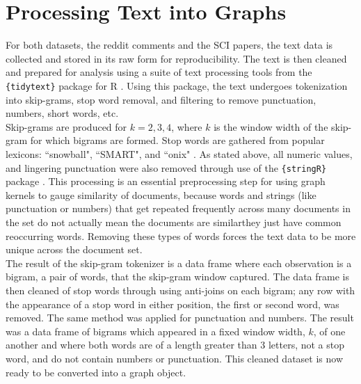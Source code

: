 %
%
%

\section{Processing Text into Graphs}

\hspace*{0.3cm} For both datasets, the reddit comments and the SCI papers, the text data is collected and stored in its raw form for reproducibility. The text is then cleaned and prepared for analysis using a suite of text processing tools from the \texttt{\{tidytext\}} package for R \cite{silge2016tidytext}. Using this package, the text undergoes tokenization into skip-grams, stop word removal, and filtering to remove punctuation, numbers, short words, etc. \\

Skip-grams are produced for $k=2,3,4$, where $k$ is the window width of the skip-gram for which bigrams are formed. Stop words are gathered from popular lexicons: ``snowball", ``SMART", and ``onix" \cite{silge2016tidytext}. As stated above, all numeric values, and lingering punctuation were also removed through use of the \texttt{\{stringR\}} package \cite{wickham2010stringr}. This processing is an essential preprocessing step for using graph kernels to gauge similarity of documents, because words and strings (like punctuation or numbers) that get repeated frequently across many documents in the set do not actually mean the documents are similar\textemdash they just have common reoccurring words. Removing these types of words forces the text data to be more unique across the document set.  \\

The result of the skip-gram tokenizer is a data frame where each observation is a bigram, a pair of words, that the skip-gram window captured. The data frame is then cleaned of stop words through using anti-joins on each bigram; any row with the appearance of a stop word in either position, the first or second word, was removed. The same method was applied for punctuation and numbers. The result was a data frame of bigrams which appeared in a fixed window width, $k$, of one another and where both words are of a length greater than 3 letters, not a stop word, and do not contain numbers or punctuation. This cleaned dataset is now ready to be converted into a graph object. \\


